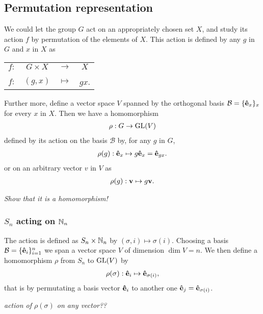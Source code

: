 	

\subsection{Permutation representation}

	We could let the group $G$ act on an appropriately chosen set $X$, and study its action $f$ by permutation of the elements of $X$. This action is defined by any $g$ in $G$ and $x$ in $X$ as
	\begin{table}[hbt!]\centering\begin{tabular}{c c c c}
			$f:$ & $G \times X$    & $\rightarrow$ & $X$ \\
			&\rotatebox[origin=c]{90}{$\in$}&&\rotatebox[origin=c]{90}{$\in$} \\
			$f:$ & $(g,x)$ & $\mapsto$     & $gx$.
	\end{tabular}\end{table}
	
	Further more, define a vector space $V$ spanned by the orthogonal basis $\mathcal{B} = \{\mathbf{\hat{e}}_x\}_x$ for every $x$ in $X$. Then we have a homomorphism
	\begin{align}
		\rho: G \rightarrow \text{GL}(V)
	\end{align}
	defined by its action on the basis $\mathcal{B}$ by, for any $g$ in $G$,
	\begin{align}
		\rho(g): \mathbf{\hat{e}}_x \mapsto g\mathbf{\hat{e}}_x = \mathbf{\hat{e}}_{gx}.
	\end{align}
	or on an arbitrary vector $v$ in $V$ as
	\begin{align}
		\rho(g): \mathbf{v} \mapsto g\mathbf{v}.
	\end{align}
	
	\textit{Show that it is a homomorphism!}
	
	\subsubsection{$S_n$ acting on $\mathbb{N}_n$}
	The action is defined as $S_n \times \mathbb{N}_n$ by $(\sigma,i) \mapsto \sigma(i)$. Choosing a basis $\mathcal{B} = \{\mathbf{\hat{e}}_i\}_{i=1}^n$ we span a vector space $V$ of dimension $\dim V = n$. We then define a homomorphism $\rho$ from $S_n$ to $\text{GL}(V)$ by
	\begin{align}
		\rho(\sigma): \mathbf{\hat{e}}_i \mapsto \mathbf{\hat{e}}_{\sigma(i)},
	\end{align}
	that is by permutating a basis vector $\mathbf{\hat{e}}_i$ to another one $\mathbf{\hat{e}}_j = \mathbf{\hat{e}}_{\sigma(i)}$.
	
	\textit{action of $\rho(\sigma)$ on any vector??}
	
